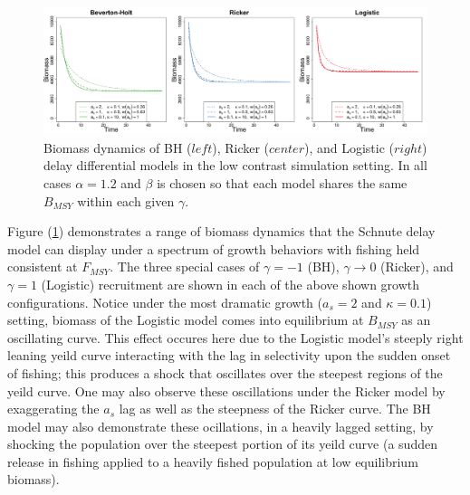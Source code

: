 %
\begin{figure}[h!]
\includegraphics[width=\textwidth]{../ddBias/growthTriptic.png}
\caption{
Biomass dynamics of BH ($left$), Ricker ($center$), and Logistic ($right$) 
delay differential models in the low contrast simulation setting. In all cases 
$\alpha=1.2$ and $\beta$ is chosen so that each model shares the same 
$B_{MSY}$ within each given $\gamma$.
}\label{delayTriptic}
\end{figure}
%
Figure (\ref{delayTriptic}) demonstrates a range of biomass dynamics that the Schnute 
delay model can display under a spectrum of growth behaviors with fishing held consistent 
at $F_{MSY}$. The three special cases of $\gamma=-1$ (BH), $\gamma\to0$ 
(Ricker), and $\gamma=1$ (Logistic) recruitment are shown in each of the above 
shown growth configurations.
%
Notice under the most dramatic growth ($a_s=2$ and $\kappa=0.1$) setting, biomass 
of the Logistic model comes into equilibrium at $B_{MSY}$ as an oscillating 
curve. This effect occures here due to the Logistic model's steeply right 
leaning yeild curve interacting with the lag in selectivity upon the sudden 
onset of fishing; this produces a shock that oscillates over the steepest 
regions of the yeild curve. One may also observe these oscillations under the 
Ricker model by exaggerating the $a_s$ lag as well as the steepness of the 
Ricker curve. The BH model may also demonstrate these ocillations, in a 
heavily lagged setting, by shocking the population over the steepest portion 
of its yeild curve (a sudden release in fishing applied to a heavily fished 
population at low equilibrium biomass). 

